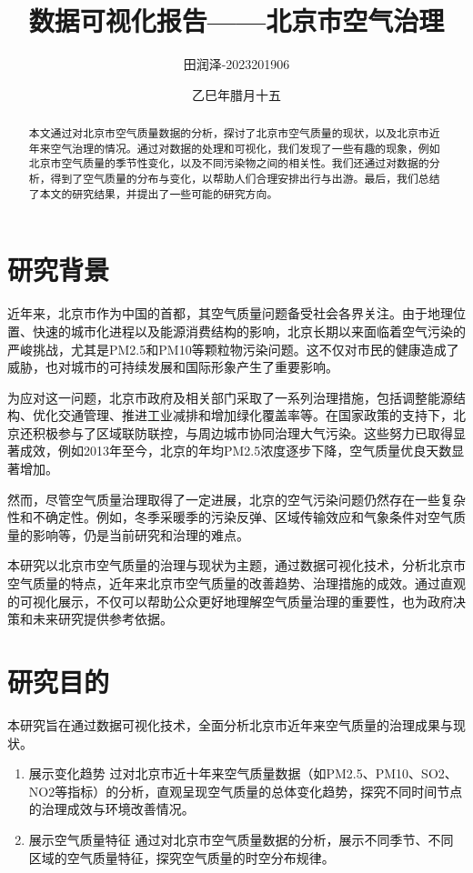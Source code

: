 \documentclass[12pt, a4paper, oneside]{ctexart}
\title{\textbf{数据可视化报告——北京市空气治理}}
\author{田润泽-2023201906}
\date{乙巳年腊月十五}
\begin{document}
\maketitle
\begin{abstract}
    本文通过对北京市空气质量数据的分析，探讨了北京市空气质量的现状，以及北京市近年来空气治理的情况。通过对数据的处理和可视化，我们发现了一些有趣的现象，例如北京市空气质量的季节性变化，以及不同污染物之间的相关性。我们还通过对数据的分析，得到了空气质量的分布与变化，以帮助人们合理安排出行与出游。最后，我们总结了本文的研究结果，并提出了一些可能的研究方向。
\end{abstract}

\section{研究背景}
近年来，北京市作为中国的首都，其空气质量问题备受社会各界关注。由于地理位置、快速的城市化进程以及能源消费结构的影响，北京长期以来面临着空气污染的严峻挑战，尤其是PM2.5和PM10等颗粒物污染问题。这不仅对市民的健康造成了威胁，也对城市的可持续发展和国际形象产生了重要影响。

为应对这一问题，北京市政府及相关部门采取了一系列治理措施，包括调整能源结构、优化交通管理、推进工业减排和增加绿化覆盖率等。在国家政策的支持下，北京还积极参与了区域联防联控，与周边城市协同治理大气污染。这些努力已取得显著成效，例如2013年至今，北京的年均PM2.5浓度逐步下降，空气质量优良天数显著增加。

然而，尽管空气质量治理取得了一定进展，北京的空气污染问题仍然存在一些复杂性和不确定性。例如，冬季采暖季的污染反弹、区域传输效应和气象条件对空气质量的影响等，仍是当前研究和治理的难点。

本研究以北京市空气质量的治理与现状为主题，通过数据可视化技术，分析北京市空气质量的特点，近年来北京市空气质量的改善趋势、治理措施的成效。通过直观的可视化展示，不仅可以帮助公众更好地理解空气质量治理的重要性，也为政府决策和未来研究提供参考依据。
\section{研究目的}
本研究旨在通过数据可视化技术，全面分析北京市近年来空气质量的治理成果与现状。
\begin{enumerate}
    \item 展示变化趋势
    过对北京市近十年来空气质量数据（如PM2.5、PM10、SO2、NO2等指标）的分析，直观呈现空气质量的总体变化趋势，探究不同时间节点的治理成效与环境改善情况。
    \item 展示空气质量特征
    通过对北京市空气质量数据的分析，展示不同季节、不同区域的空气质量特征，探究空气质量的时空分布规律。
\end{enumerate}
\end{document}
